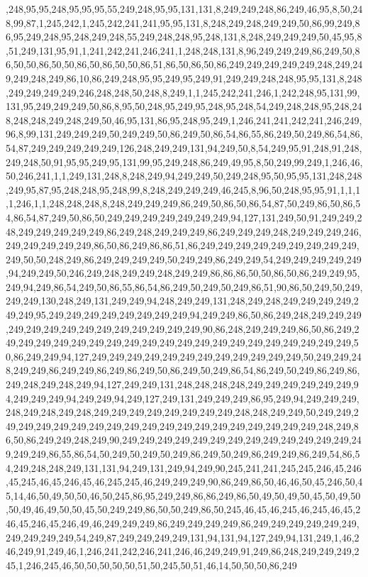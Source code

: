 ,248,95,95,248,95,95,95,55,249,248,95,95,131,131,8,249,249,248,86,249,46,95,8,50,248,99,87,1,245,242,1,245,242,241,241,95,95,131,8,248,249,248,249,249,50,86,99,249,86,95,249,248,95,248,249,248,55,249,248,248,95,248,131,8,248,249,249,249,50,45,95,8,51,249,131,95,91,1,241,242,241,246,241,1,248,248,131,8,96,249,249,249,86,249,50,86,50,50,86,50,50,86,50,86,50,50,86,51,86,50,86,50,86,249,249,249,249,249,248,249,249,249,248,249,86,10,86,249,248,95,95,249,95,249,91,249,249,248,248,95,95,131,8,248,249,249,249,249,246,248,248,50,248,8,249,1,1,245,242,241,246,1,242,248,95,131,99,131,95,249,249,249,50,86,8,95,50,248,95,249,95,248,95,248,54,249,248,248,95,248,248,248,248,249,248,249,50,46,95,131,86,95,248,95,249,1,246,241,241,242,241,246,249,96,8,99,131,249,249,249,50,249,249,50,86,249,50,86,54,86,55,86,249,50,249,86,54,86,54,87,249,249,249,249,249,126,248,249,249,131,94,249,50,8,54,249,95,91,248,91,248,249,248,50,91,95,95,249,95,131,99,95,249,248,86,249,49,95,8,50,249,99,249,1,246,46,50,246,241,1,1,249,131,248,8,248,249,94,249,249,50,249,248,95,50,95,95,131,248,248,249,95,87,95,248,248,95,248,99,8,248,249,249,249,46,245,8,96,50,248,95,95,91,1,1,1,1,246,1,1,248,248,248,8,248,249,249,249,86,249,50,86,50,86,54,87,50,249,86,50,86,54,86,54,87,249,50,86,50,249,249,249,249,249,249,249,94,127,131,249,50,91,249,249,248,249,249,249,249,249,86,249,248,249,249,249,86,249,249,249,248,249,249,249,246,249,249,249,249,249,86,50,86,249,86,86,51,86,249,249,249,249,249,249,249,249,249,249,50,50,248,249,86,249,249,249,249,50,249,249,86,249,249,54,249,249,249,249,249,94,249,249,50,246,249,248,249,249,248,249,249,86,86,86,50,50,86,50,86,249,249,95,249,94,249,86,54,249,50,86,55,86,54,86,249,50,249,50,249,86,51,90,86,50,249,50,249,249,249,130,248,249,131,249,249,94,248,249,249,131,248,249,248,249,249,249,249,249,249,95,249,249,249,249,249,249,249,249,94,249,249,86,50,86,249,248,249,249,249,249,249,249,249,249,249,249,249,249,249,249,90,86,248,249,249,249,86,50,86,249,249,249,249,249,249,249,249,249,249,249,249,249,249,249,249,249,249,249,249,249,50,86,249,249,94,127,249,249,249,249,249,249,249,249,249,249,249,249,50,249,249,248,249,249,86,249,249,86,249,86,249,50,86,249,50,249,86,54,86,249,50,249,86,249,86,249,248,249,248,249,94,127,249,249,131,248,248,248,248,249,249,249,249,249,249,94,249,249,249,94,249,249,94,249,127,249,131,249,249,249,86,95,249,94,249,249,249,248,249,248,249,248,249,249,249,249,249,249,249,249,248,248,249,249,50,249,249,249,249,249,249,249,249,249,249,249,249,249,249,249,249,249,249,249,249,248,249,86,50,86,249,249,248,249,90,249,249,249,249,249,249,249,249,249,249,249,249,249,249,249,249,86,55,86,54,50,249,50,249,50,249,86,249,50,249,86,249,249,86,249,54,86,54,249,248,248,249,131,131,94,249,131,249,94,249,90,245,241,241,245,245,246,45,246,45,245,46,45,246,45,46,245,245,46,249,249,249,90,86,249,86,50,46,46,50,45,246,50,45,14,46,50,49,50,50,46,50,245,86,95,249,249,86,86,249,86,50,49,50,49,50,45,50,49,50,50,49,46,49,50,50,45,50,249,249,86,50,50,249,86,50,245,46,45,46,245,46,245,46,45,246,45,246,45,246,49,46,249,249,249,86,249,249,249,249,86,249,249,249,249,249,249,249,249,249,249,54,249,87,249,249,249,249,131,94,131,94,127,249,94,131,249,1,46,246,249,91,249,46,1,246,241,242,246,241,246,46,249,249,91,249,86,248,249,249,249,245,1,246,245,46,50,50,50,50,50,51,50,245,50,51,46,14,50,50,50,86,249